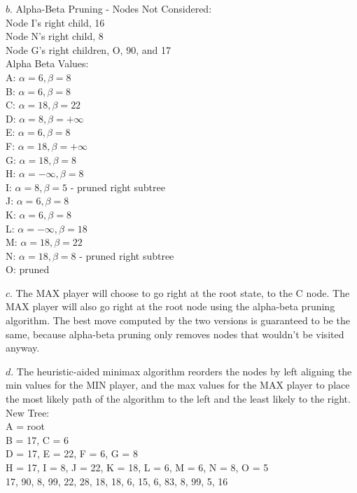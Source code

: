 \documentclass[11pt, oneside]{article}   	%
\begin{document}
\begin{flushleft}
$b$. Alpha-Beta Pruning - Nodes Not Considered:\\
Node I's right child, 16\\
Node N's right child, 8\\
Node G's right children, O, 90, and 17\\\medskip
Alpha Beta Values:\\
A: $\alpha = 6, \beta = 8$\\
B: $\alpha = 6, \beta = 8$ \\
C: $\alpha = 18, \beta = 22$ \\
D: $\alpha = 8, \beta = +\infty$ \\
E: $\alpha = 6, \beta = 8$ \\
F: $\alpha = 18, \beta = +\infty$ \\
G: $\alpha = 18, \beta = 8$ \\
H: $\alpha = -\infty, \beta = 8$ \\
I: $\alpha = 8, \beta = 5$ - pruned right subtree\\
J: $\alpha = 6, \beta = 8$ \\
K: $\alpha = 6, \beta = 8$ \\
L: $\alpha = -\infty, \beta = 18$ \\
M: $\alpha = 18, \beta = 22$ \\
N: $\alpha = 18, \beta = 8$ - pruned right subtree\\
O: pruned \\\medskip

$c$. The MAX player will choose to go right at the root state, to the C node. The MAX player will also go right at the root node using the alpha-beta pruning algorithm. The best move computed by the two versions is guaranteed to be the same, because alpha-beta pruning only removes nodes that wouldn't be visited anyway.\\\medskip

$d$. The heuristic-aided minimax algorithm reorders the nodes by left aligning the min values for the MIN player, and the max values for the MAX player to place the most likely path of the algorithm to the left and the least likely to the right.\\
New Tree: \\
A = root\\
B = 17, C = 6\\
D = 17, E = 22, F = 6, G = 8\\
H = 17, I = 8, J = 22, K = 18, L = 6, M = 6, N = 8, O = 5\\
17, 90, 8, 99, 22, 28, 18, 18, 6, 15, 6, 83, 8, 99, 5, 16 \\\medskip


\end{flushleft}
\end{document}
